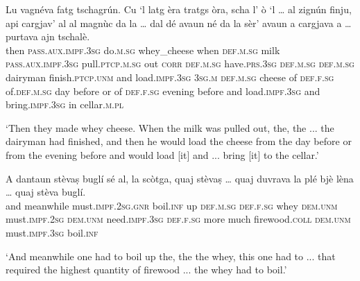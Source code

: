 \begin{linenumbers}
	\gll Lu vagnéva fatg tschagrún. Cu `l latg èra tratgs òra, scha l’ ò `l … al zignún finju, api cargjav’ al al magnùc da la … dal dé avaun né da la sèr’ avaun a cargjava a … purtava ajn tschalè.   \\
	then \textsc{pass.aux.impf.3sg} do.\textsc{m.sg} whey\_cheese when \textsc{def.m.sg} milk \textsc{pass.aux.impf.3sg} pull.\textsc{ptcp.m.sg} out \textsc{corr} \textsc{def.m.sg} have.\textsc{prs.3sg} \textsc{def.m.sg} {} \textsc{def.m.sg} dairyman finish.\textsc{ptcp.unm} and load.\textsc{impf.3sg} \textsc{3sg.m} \textsc{def.m.sg} cheese of \textsc{def.f.sg} {} of.\textsc{def.m.sg} day before or of \textsc{def.f.sg} evening before and load.\textsc{impf.3sg} and {} bring.\textsc{impf.3sg} in cellar.\textsc{m.pl}\\
\end{linenumbers}
\medskip
\glt `Then they made whey cheese. When the milk was pulled out, the, the ... the dairyman had finished, and then he would load the cheese from the day before or from the evening before and would load [it] and ... bring [it] to the cellar.'
\medskip

\begin{linenumbers}
	\gll  A dantaun stèvaṣ buglí sé al, la scòtga, quaj stèvaṣ … quaj duvrava la plé bjè lèna … quaj stèva buglí.  \\
	and meanwhile must.\textsc{impf.2sg.gnr} boil.\textsc{inf} up \textsc{def.m.sg} \textsc{def.f.sg} whey \textsc{dem.unm} must.\textsc{impf.2sg} {} \textsc{dem.unm} need.\textsc{impf.3sg} \textsc{def.f.sg} more much firewood.\textsc{coll} {} \textsc{dem.unm} must.\textsc{impf.3sg} boil.\textsc{inf}\\
\end{linenumbers}
\medskip
\glt `And meanwhile one had to boil up the, the the whey, this one had to ... that required the highest quantity of firewood ... the whey had to boil.'
\medskip

